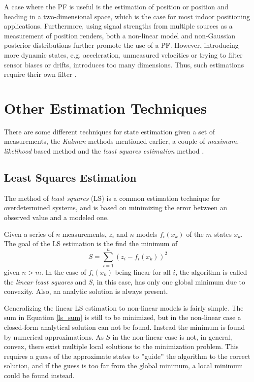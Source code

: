 \documentclass{LTHthesis}
\begin{document}
A case where the PF is useful is the estimation of position or position and heading in a two-dimensional space, which is the case for most indoor positioning applications. Furthermore, using signal strengths from multiple sources as a measurement of position renders, both a non-linear model and non-Gaussian posterior distributions further promote the use of a PF. However, introducing more dynamic states, e.g. acceleration, unmeasured velocities or trying to filter sensor biases or drifts, introduces too many dimensions. Thus, such estimations require their own filter \cite{gson12}.        
%
\section{Other Estimation Techniques}
\label{sec:oet}
%
There are some different techniques for state estimation given a set of measurements, the \emph{Kalman} methods mentioned earlier, a couple of \emph{maximum.-likelihood} based method and the \emph{least squares estimation} method \cite{gson12}.
%
 \subsection{Least Squares Estimation}
%
The method of \emph{least squares} (LS) is a common estimation technique for overdetermined systems, and is based on minimizing the error between an observed value and a modeled one. 

Given a series of $n$ measurements, $z_i$ and $n$ models $f_i(x_k)$ of the $m$ states $x_k$. The goal of the LS estimation is the find the minimum of
%
\begin{equation}
S = \sum_{i=1}^n(z_i-f_i(x_k))^2
\label{ls_sum}
\end{equation}
%
given $n>m$. In the case of $f_i(x_k)$ being linear for all $i$, the algorithm is called the \emph{linear least squares} and $S$, in this case, has only one global minimum due to convexity. Also, an analytic solution is always present.

Generalizing the linear LS estimation to non-linear models is fairly simple. The sum in Equation \ref{ls_sum} is still to be minimized, but in the non-linear case a closed-form analytical solution can not be found. Instead the minimum is found by numerical approximations. As $S$ in the non-linear case is not, in general, convex, there exist multiple local solutions to the minimization problem. This requires a guess of the approximate states to ''guide'' the algorithm to the correct solution, and if the guess is too far from the global minimum, a local minimum could be found instead.     
\end{document}
